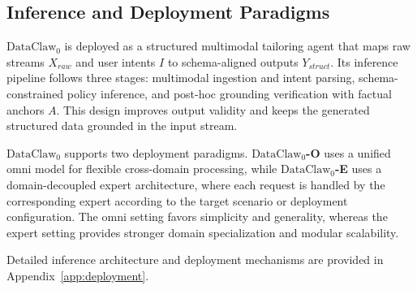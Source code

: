 \documentclass{llmxive}
\begin{document}
\subsection{Inference and Deployment Paradigms}

$\text{DataClaw}_0$ is deployed as a structured multimodal tailoring agent that maps raw streams \(X_{raw}\) and user intents \(I\) to schema-aligned outputs \(Y_{struct}\). 
Its inference pipeline follows three stages: multimodal ingestion and intent parsing, schema-constrained policy inference, and post-hoc grounding verification with factual anchors \(A\). This design improves output validity and keeps the generated structured data grounded in the input stream.

$\text{DataClaw}_0$ supports two deployment paradigms. \textbf{$\text{DataClaw}_0$-O} uses a unified omni model for flexible cross-domain processing, while \textbf{$\text{DataClaw}_0$-E} uses a domain-decoupled expert architecture, where each request is handled by the corresponding expert according to the target scenario or deployment configuration. The omni setting favors simplicity and generality, whereas the expert setting provides stronger domain specialization and modular scalability.

Detailed inference architecture and deployment mechanisms are provided in Appendix~\ref{app:deployment}.




\end{document}
